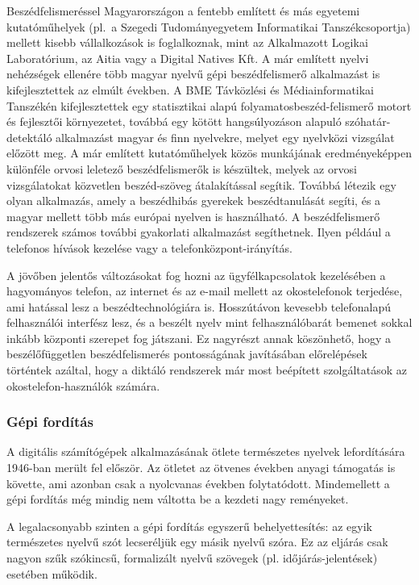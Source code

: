 \begin{multicols}{2}
Beszédfelismeréssel Magyarországon a fentebb említett és más egyetemi ku\-ta\-tó\-mű\-he\-lyek (pl.~a Szegedi Tu\-do\-mány\-egye\-tem Informatikai Tanszékcsoportja) mellett kisebb vállalkozások is foglalkoznak, mint az Alkalmazott Logikai La\-bo\-ra\-tó\-ri\-um, az Aitia vagy a Digital Natives Kft. A már említett nyelvi nehézségek ellenére több magyar nyelvű gépi beszédfelismerő alkalmazást is kifejlesztettek az elmúlt években. A BME Távközlési és Mé\-dia\-in\-for\-ma\-ti\-kai Tanszékén kifejlesztettek egy statisztikai alapú folyamatosbeszéd-felismerő motort és fejlesztői környezetet, továbbá egy kötött hangsúlyozáson alapuló szóhatár-detektáló alkalmazást ma\-gyar és finn nyelvekre, melyet egy nyelv\-kö\-zi vizsgálat előzött meg. A már említett kutatóműhelyek közös munkájának eredményeképpen különféle orvosi leletező beszédfelismerők is készültek, melyek az orvosi vizsgálatokat közvetlen beszéd-szöveg átalakítással segítik. Továbbá létezik egy olyan alkalmazás, amely a beszédhibás gyerekek beszédtanulását se\-gí\-ti, és a magyar mellett több más európai nyelven is használható. A beszédfelismerő rendszerek számos további gyakorlati alkalmazást segíthetnek. Ilyen például a telefonos hívások kezelése vagy a te\-le\-fon\-köz\-pont-irányítás.

A jövőben jelentős változásokat fog hozni az ügyfélkapcsolatok kezelésében a ha\-gyo\-má\-nyos telefon, az internet és az e-mail mellett az okostelefonok terjedése, ami hatással lesz a beszédtechnológiára is. Hosszútávon kevesebb telefonalapú felhasználói interfész lesz, és a beszélt nyelv mint felhasználóbarát bemenet sokkal inkább központi szerepet fog játszani. Ez nagyrészt annak köszönhető, hogy a beszélőfüggetlen beszédfelismerés pontosságának javításában előrelépések tör\-tén\-tek azáltal, hogy a diktáló rend\-sze\-rek már most beépített szolgáltatások az okostelefon-használók számára.

\subsubsection{Gépi fordítás}

A digitális számítógépek alkalmazásának ötlete természetes nyelvek lefordítására 1946-ban merült fel először. Az ötletet az ötvenes években anyagi támogatás is követte, ami azonban csak a nyolcvanas években folytatódott. Mindemellett a gépi fordítás még mindig nem váltotta be a kezdeti nagy reményeket.

A legalacsonyabb szinten a gépi fordítás egyszerű behelyettesítés: az egyik természetes nyelvű szót lecseréljük egy másik nyelvű szóra. Ez az eljárás csak nagyon szűk szókincsű, formalizált nyelvű szö\-ve\-gek (pl. időjárás-jelentések) esetében működik. 


\end{multicols}
